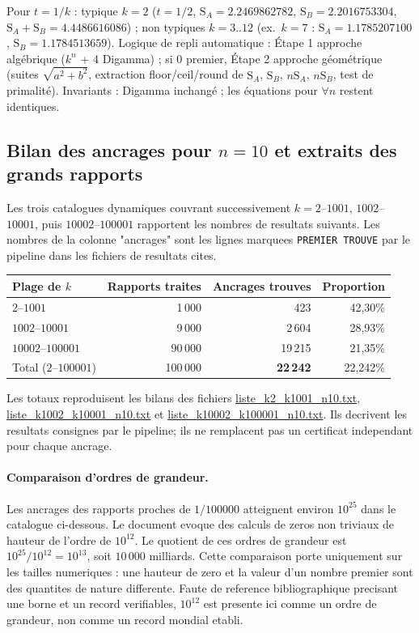 \documentclass[11pt,a4paper]{article}
\newcommand{\SA}{\mathrm{S}_A}
\newcommand{\SB}{\mathrm{S}_B}
\begin{document}
Pour $t = 1/k$ : typique $k=2$ ($t = 1/2$, $\SA = 2.2469862782$,
$\SB = 2.2016753304$, $\SA + \SB = 4.4486616086$) ; non typiques $k = 3..12$
(ex.\ $k=7$ : $\SA = 1.1785207100$, $\SB = 1.1784513659$). Logique de repli
automatique : Étape 1 approche algébrique ($k^{n}$ + 4 Digamma) ; si 0 premier,
Étape 2 approche géométrique (suites $\sqrt{a^{2}+b^{2}}$, extraction
floor/ceil/round de $\SA$, $\SB$, $n\SA$, $n\SB$, test de primalité).
Invariants : Digamma inchangé ; les équations pour $\forall n$ restent
identiques.

\subsection{Bilan des ancrages pour \texorpdfstring{$n=10$}{n=10} et extraits des grands rapports}
Les trois catalogues dynamiques couvrant successivement $k=2$--$1001$, $1002$--
$10001$, puis $10002$--$100001$ rapportent les nombres de resultats suivants.
Les nombres de la colonne "ancrages" sont les lignes marquees \texttt{PREMIER TROUVE}
par le pipeline dans les fichiers de resultats cites.

\begin{center}\small
\begin{tabular}{@{}l r r r@{}}
\toprule
\rowcolor{spectralgris}
Plage de $k$ & Rapports traites & Ancrages trouves & Proportion \\
\midrule
$2$--$1001$ & 1\,000 & 423 & 42,30\% \\
$1002$--$10001$ & 9\,000 & 2\,604 & 28,93\% \\
$10002$--$100001$ & 90\,000 & 19\,215 & 21,35\% \\
\midrule
\rowcolor{spectralazur!8}
Total ($2$--$100001$) & 100\,000 & \textbf{22\,242} & 22,242\% \\
\bottomrule
\end{tabular}
\end{center}

Les totaux reproduisent les bilans des fichiers \url{liste_k2_k1001_n10.txt},
\url{liste_k1002_k10001_n10.txt} et
\url{liste_k10002_k100001_n10.txt}. Ils decrivent les resultats consignes par
le pipeline; ils ne remplacent pas un certificat independant pour chaque ancrage.

\paragraph{Comparaison d'ordres de grandeur.}
Les ancrages des rapports proches de $1/100000$ atteignent environ $10^{25}$ dans le
catalogue ci-dessous. Le document evoque des calculs de zeros non triviaux de hauteur
de l'ordre de $10^{12}$. Le quotient de ces ordres de grandeur est
$10^{25}/10^{12}=10^{13}$, soit $10\,000$ milliards. Cette comparaison porte uniquement
sur les tailles numeriques : une hauteur de zero et la valeur d'un nombre premier sont
des quantites de nature differente. Faute de reference bibliographique precisant une
borne et un record verifiables, $10^{12}$ est presente ici comme un ordre de grandeur,
non comme un record mondial etabli.
\end{document}

